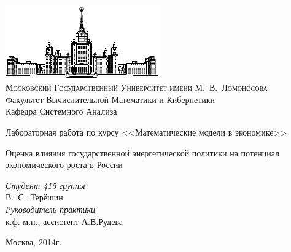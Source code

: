 \documentclass[12pt]{article}
\theoremstyle{rusdef}
\begin{document}
\thispagestyle{empty}

\begin{center}
\ \vspace{-3cm}

\includegraphics[width=0.5\textwidth]{msu.eps}\\

{\scshape Московский Государственный Университет имени М.~В.~Ломоносова}\\
Факультет Вычислительной Математики и Кибернетики\\
Кафедра Системного Анализа
\vfill

{\LARGE Лабораторная работа по курсу <<Математические модели в экономике>>}

{\LARGE Оценка влияния государственной энергетической политики на потенциал экономического роста в России}
\vspace{.5cm}

\end{center}

\vspace{1cm}

\begin{flushright}
\large
\textit{Студент 415 группы}\\
В.~С.~Терёшин\\
\vspace{5mm}
\textit{Руководитель практики}\\
к.ф.-м.н., ассистент А.В.Рудева

\end{flushright}

\vfill

\begin{center}
{\large
Москва, 2014г.}
\end{center}

\newpage
\tableofcontents
\newpage
\end{document}
